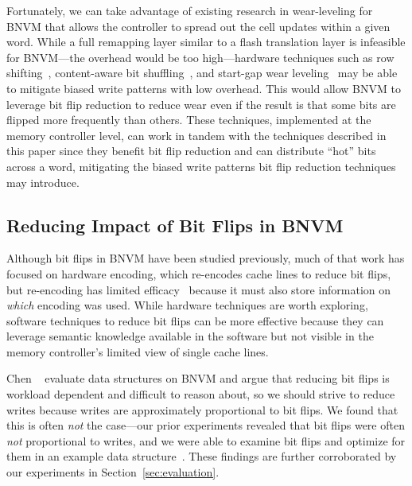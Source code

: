 Fortunately, we can take advantage of existing research in wear-leveling for BNVM that allows
the controller to spread out the cell updates within a given word.
While a full remapping layer similar to a flash translation layer is infeasible
for BNVM---the overhead would be too high---hardware techniques such as row
shifting~\cite{zhou:isca09:fixed}, content-aware bit shuffling~\cite{Han:cabs}, and
start-gap wear leveling~\cite{qureshi:micro09} may be able to mitigate biased
write patterns with low overhead. This would allow BNVM to leverage bit flip
reduction to reduce wear even if the result is that some bits are flipped more
frequently than others.  These techniques, implemented at the memory
controller level, can work in tandem with the techniques described in this paper since they benefit
bit flip reduction and can distribute ``hot'' bits across a word, mitigating the biased write
patterns bit flip reduction techniques may introduce.


\subsection{Reducing Impact of Bit Flips in BNVM}

Although bit flips in BNVM have been studied previously, much of that work has
focused on hardware encoding, which re-encodes cache lines to reduce bit flips,
but re-encoding has limited efficacy~\cite{flipnwrite,
	jacobvitz2013coset, seyedzadeh2016coset} because it must also store information
on \textit{which} encoding was used. While hardware techniques are worth
exploring, software techniques to reduce bit flips can be more effective because
they can leverage semantic knowledge available in the software but not
visible in the memory controller's limited view of single cache lines.

Chen \etal~\cite{Chen_rethinkingdatabase} evaluate data structures on BNVM and
argue that reducing bit flips is workload dependent and difficult to reason
about, so we should strive to reduce writes because writes are approximately
proportional to bit flips. We found that this is often \emph{not} the case---our prior experiments
revealed that bit flips were often \emph{not} proportional to writes, and we were able to
examine bit flips and optimize for them in an example data structure~\cite{bittman:nvmsa18}. These findings are further
corroborated by our experiments in Section~\ref{sec:evaluation}.


